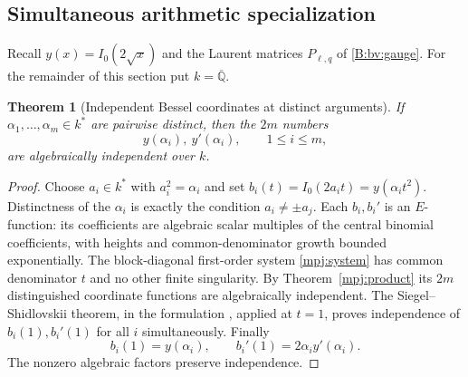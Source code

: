 \documentclass[11pt,a4paper]{article}
\newtheorem{theorem}{Theorem}[section]
\theoremstyle{definition}
\theoremstyle{remark}
\numberwithin{equation}{section}
\begin{document}
\subsection{Simultaneous arithmetic specialization}

Recall $y(x)=I_0(2\sqrt{x})$ and the Laurent matrices
$P_{\ell,q}$ of \eqref{B:bv:gauge}. For the remainder of this section
put $k=\overline{\mathbb Q}$.

\begin{theorem}[Independent Bessel coordinates at distinct arguments]
\label{mpj:basevalues}
If $\alpha_1,\ldots,\alpha_m\in k^*$ are pairwise distinct,
then the $2m$ numbers
\[
                y(\alpha_i),\ y'(\alpha_i),\qquad 1\le i\le m,
\]
are algebraically independent over $k$.
\end{theorem}
\begin{proof}
Choose $a_i\in k^*$ with $a_i^2=\alpha_i$ and set
$b_i(t)=I_0(2a_it)=y(\alpha_i t^2)$. Distinctness of the
$\alpha_i$ is exactly the condition $a_i\ne\pm a_j$.
Each $b_i,b_i'$ is an $E$-function: its coefficients are
algebraic scalar multiples of the central binomial coefficients,
with heights and common-denominator growth bounded exponentially.
The block-diagonal first-order system \eqref{mpj:system} has
common denominator $t$ and no other finite singularity.
By Theorem~\ref{mpj:product} its $2m$ distinguished coordinate
functions are algebraically independent. The
Siegel--Shidlovskii theorem, in the formulation
\cite[Theorem~1.1]{BVBeukers2006}, applied at $t=1$, proves
independence of $b_i(1),b_i'(1)$ for all $i$ simultaneously.
Finally
\[
 b_i(1)=y(\alpha_i),\qquad b_i'(1)=2\alpha_i y'(\alpha_i).
\]
The nonzero algebraic factors preserve independence.
\end{proof}
\end{document}
